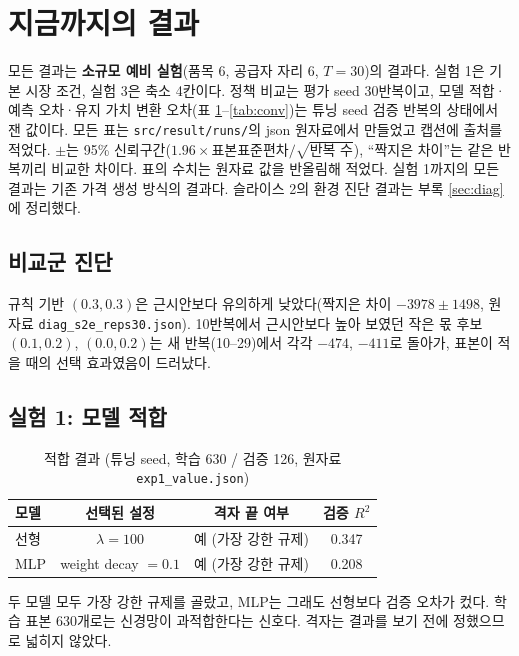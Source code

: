 \documentclass[11pt,a4paper]{article}
\begin{document}
\section{지금까지의 결과}

모든 결과는 \textbf{소규모 예비 실험}(품목 6, 공급자 자리 6, $T=30$)의 결과다. 실험 1은 기본 시장 조건, 실험 3은 축소 4칸이다.
정책 비교는 평가 seed 30반복이고, 모델 적합·예측 오차·유지 가치 변환 오차(표 \ref{tab:fit}--\ref{tab:conv})는 튜닝 seed 검증 반복의
상태에서 잰 값이다. 모든 표는 \texttt{src/result/runs/}의 json 원자료에서 만들었고 캡션에 출처를 적었다.
$\pm$는 95\% 신뢰구간($1.96\times$표본표준편차$/\sqrt{\text{반복 수}}$), ``짝지은 차이''는 같은 반복끼리 비교한 차이다.
표의 수치는 원자료 값을 반올림해 적었다. 실험 1까지의 모든 결과는 기존 가격 생성 방식의 결과다.
슬라이스 2의 환경 진단 결과는 부록 \ref{sec:diag}에 정리했다.

\subsection{비교군 진단}\label{sec:baseline}

규칙 기반 $(0.3,0.3)$은 근시안보다 유의하게 낮았다(짝지은 차이 $-3978\pm1498$, 원자료 \texttt{diag\_s2e\_reps30.json}).
10반복에서 근시안보다 높아 보였던 작은 몫 후보 $(0.1,0.2)$, $(0.0,0.2)$는 새 반복(10--29)에서
각각 $-474$, $-411$로 돌아가, 표본이 적을 때의 선택 효과였음이 드러났다.

\subsection{실험 1: 모델 적합}

\begin{table}[H]
\centering\small
\caption{적합 결과 (튜닝 seed, 학습 630 / 검증 126, 원자료 \texttt{exp1\_value.json})}\label{tab:fit}
\begin{tabular}{lccc}
\toprule
모델 & 선택된 설정 & 격자 끝 여부 & 검증 $R^2$\\
\midrule
선형 & $\lambda=100$ & 예 (가장 강한 규제) & 0.347\\
MLP & weight decay $=0.1$ & 예 (가장 강한 규제) & 0.208\\
\bottomrule
\end{tabular}
\end{table}

두 모델 모두 가장 강한 규제를 골랐고, MLP는 그래도 선형보다 검증 오차가 컸다.
학습 표본 630개로는 신경망이 과적합한다는 신호다. 격자는 결과를 보기 전에 정했으므로 넓히지 않았다.
\end{document}
